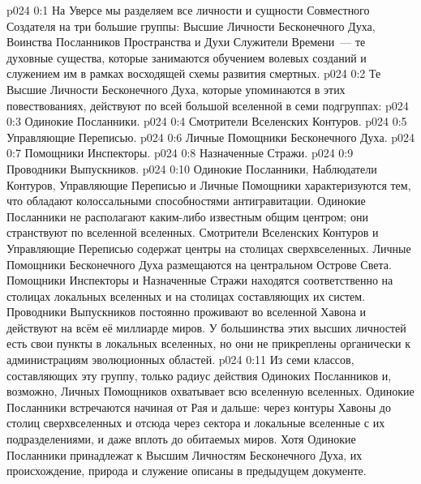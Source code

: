 \author{Божественный Советник}
\vs p024 0:1 На Уверсе мы разделяем все личности и сущности Совместного Создателя на три большие группы: Высшие Личности Бесконечного Духа, Воинства Посланников Пространства и Духи Служители Времени~--- те духовные существа, которые занимаются обучением волевых созданий и служением им в рамках восходящей схемы развития смертных.
\vs p024 0:2 \pc Те Высшие Личности Бесконечного Духа, которые упоминаются в этих повествованиях, действуют по всей большой вселенной в семи подгруппах:
\vs p024 0:3 Одинокие Посланники.
\vs p024 0:4 Смотрители Вселенских Контуров.
\vs p024 0:5 Управляющие Переписью.
\vs p024 0:6 Личные Помощники Бесконечного Духа.
\vs p024 0:7 Помощники Инспекторы.
\vs p024 0:8 Назначенные Стражи.
\vs p024 0:9 Проводники Выпускников.
\vs p024 0:10 \pc Одинокие Посланники, Наблюдатели Контуров, Управляющие Переписью и Личные Помощники характеризуются тем, что обладают колоссальными способностями антигравитации. Одинокие Посланники не располагают каким\hyp{}либо известным общим центром; они странствуют по вселенной вселенных. Смотрители Вселенских Контуров и Управляющие Переписью содержат центры на столицах сверхвселенных. Личные Помощники Бесконечного Духа размещаются на центральном Острове Света. Помощники Инспекторы и Назначенные Стражи находятся соответственно на столицах локальных вселенных и на столицах составляющих их систем. Проводники Выпускников постоянно проживают во вселенной Хавона и действуют на всём её миллиарде миров. У большинства этих высших личностей есть свои пункты в локальных вселенных, но они не прикреплены органически к администрациям эволюционных областей.
\vs p024 0:11 Из семи классов, составляющих эту группу, только радиус действия Одиноких Посланников и, возможно, Личных Помощников охватывает всю вселенную вселенных. Одинокие Посланники встречаются начиная от Рая и дальше: через контуры Хавоны до столиц сверхвселенных и отсюда через сектора и локальные вселенные с их подразделениями, и даже вплоть до обитаемых миров. Хотя Одинокие Посланники принадлежат к Высшим Личностям Бесконечного Духа, их происхождение, природа и служение описаны в предыдущем документе.
